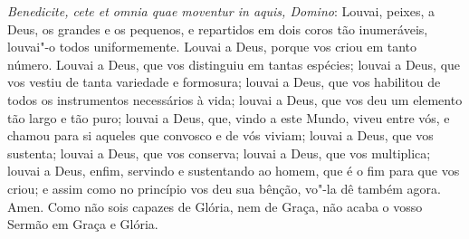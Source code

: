 \emph{Benedicite, cete et omnia quae moventur in aquis, Domino}:
Louvai, peixes, a Deus, os grandes e os pequenos, e repartidos em dois
coros tão inumeráveis, louvai"-o todos uniformemente. Louvai a Deus,
porque vos criou em tanto número.
Louvai a Deus, que vos distinguiu em tantas espécies; louvai a Deus, que
vos vestiu de tanta variedade e formosura; louvai a Deus, que vos
habilitou de todos os instrumentos necessários à vida; louvai a Deus,
que vos deu um elemento tão largo e tão puro; louvai a Deus, que, vindo
a este Mundo, viveu entre vós, e chamou para si aqueles que convosco e
de vós viviam; louvai a Deus, que vos sustenta; louvai a Deus, que vos
conserva; louvai a Deus, que vos multiplica; louvai a Deus, enfim,
servindo e sustentando ao homem, que é o fim para que vos criou; e assim
como no princípio vos deu sua bênção, vo"-la dê também agora. Amen. Como
não sois capazes de Glória, nem de Graça, não acaba o vosso Sermão em
Graça e Glória.

